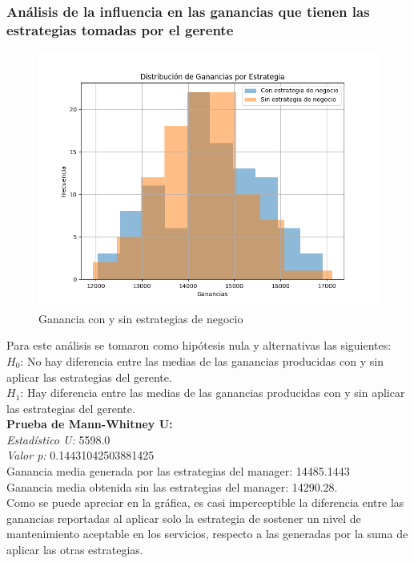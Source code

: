 \documentclass[12pt,a4paper]{article} \usepackage[spanish]{babel} \usepackage{graphicx} \usepackage{amsmath} \usepackage{amsfonts} \usepackage{amssymb} \usepackage{float} \usepackage{geometry}
\begin{document}
\subsubsection{Análisis de la influencia en las ganancias que tienen las estrategias tomadas por el gerente}
\begin{figure}[H] \centering \includegraphics[width=\textwidth]{estrategias manager} \caption{Ganancia con y sin estrategias de negocio} \label{fig:etiqueta} \end{figure}

Para este análisis se tomaron como hipótesis nula y alternativas las siguientes:\\
$H_0$: No hay diferencia entre las medias de las ganancias producidas con y sin aplicar las estrategias del gerente.\\
$H_1$: Hay diferencia entre las medias de las ganancias producidas con y sin aplicar las estrategias del gerente.\\
\textbf{Prueba de Mann-Whitney U:}\\
\textit{Estadístico U:} 5598.0\\
\textit{Valor p:} 0.14431042503881425\\
Ganancia media generada por las estrategias del manager: 14485.1443\\
Ganancia media obtenida sin las estrategias del manager: 14290.28.\\

Como se puede apreciar en la gráfica, es casi imperceptible la diferencia entre las ganancias reportadas al aplicar solo la estrategia de sostener un nivel de mantenimiento aceptable en los servicios, respecto a las generadas por la suma de aplicar las otras estrategias.\\
\end{document}
